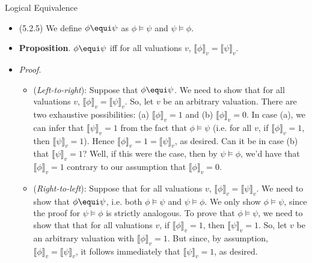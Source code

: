 \begin{frame}{Logical Equivalence}

	\begin{itemize}
	
		\item (5.2.5) We define $\phi\equi\psi$ as $\phi\vDash\psi$ and $\psi\vDash\phi$.
		
		\item \textbf{Proposition}. $\phi\equi\psi$ iff for all valuations $v$, $\llbracket\phi\rrbracket_v=\llbracket\psi\rrbracket_v$.
		
		\item[] \emph{Proof}.
		
		\begin{itemize}
			
				\item (\emph{Left-to-right}): Suppose that $\phi\equi\psi$. We need to show that for all valuations $v$, $\llbracket\phi\rrbracket_v=\llbracket\psi\rrbracket_v$. So, let $v$ be an arbitrary valuation. There are two exhaustive possibilities: (a) $\llbracket\phi\rrbracket_v=1$ and (b) $\llbracket \phi\rrbracket_v=0$. In case (a), we can infer that $\llbracket\psi\rrbracket_v=1$ from the fact that $\phi\vDash\psi$ (i.e. for all $v$, if $\llbracket\phi\rrbracket_v=1$, then $\llbracket\psi\rrbracket_v=1$). Hence $\llbracket \phi\rrbracket_v=1=\llbracket \psi\rrbracket_v$, as desired. Can it be in case (b) that $\llbracket\psi\rrbracket_v=1$? Well, if this were the case, then by $\psi\vDash\phi$, we'd have that $\llbracket\phi\rrbracket_v=1$ contrary to our assumption that $\llbracket\phi\rrbracket_v=0$.
				
				\item (\emph{Right-to-left}): Suppose that for all valuations $v$, $\llbracket\phi\rrbracket_v=\llbracket\psi\rrbracket_v$. We need to show that $\phi\equi\psi$, i.e. both $\phi\vDash\psi$ and $\psi\vDash\phi$. We only show $\phi\vDash\psi$, since the proof for  $\psi\vDash\phi$ is strictly analogous. To prove that $\phi\vDash\psi$, we need to show that that for all valuations $v$, if $\llbracket\phi\rrbracket_v=1$, then $\llbracket\psi\rrbracket_v=1$. So, let $v$ be an arbitrary valuation with $\llbracket\phi\rrbracket_v=1$. But since, by assumption, $\llbracket\phi\rrbracket_v=\llbracket\psi\rrbracket_v$, it follows immediately that $\llbracket\psi\rrbracket_v=1$, as desired.
			\end{itemize}
	
	\end{itemize}

\end{frame}

